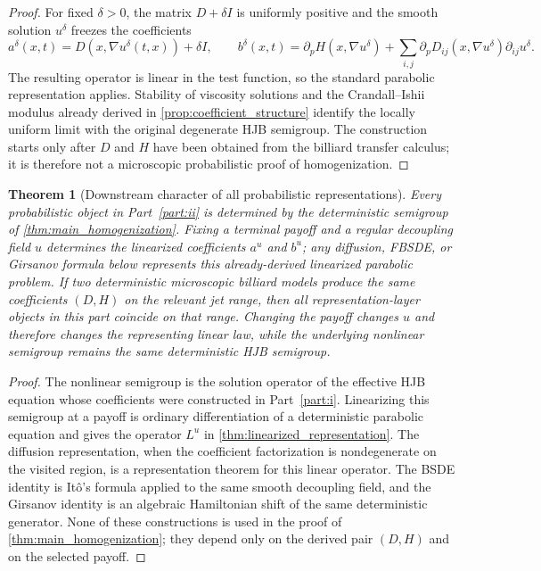 \documentclass[12pt, letterpaper]{amsart}
\theoremstyle{plain}
\newtheorem{theorem}{Theorem}[section]
\theoremstyle{definition}
\theoremstyle{remark}
\begin{document}
\begin{proof}
For fixed \(\delta>0\), the matrix \(D+\delta I\) is uniformly positive and the
smooth solution \(u^\delta\) freezes the coefficients
\begin{equation}
    a^\delta(x,t)=D(x,\nabla u^\delta(t,x))+\delta I,
    \qquad
    b^\delta(x,t)=\partial_pH(x,\nabla u^\delta)
       +\sum_{i,j}\partial_pD_{ij}(x,\nabla u^\delta)\partial_{ij}u^\delta .
\end{equation}
The resulting operator is linear in the test function, so the standard
parabolic representation applies.  Stability of viscosity solutions and the
Crandall--Ishii modulus already derived in \cref{prop:coefficient_structure}
identify the locally uniform limit with the original degenerate HJB semigroup.
The construction starts only after \(D\) and \(H\) have been obtained from the
billiard transfer calculus; it is therefore not a microscopic probabilistic
proof of homogenization.
\end{proof}

\begin{theorem}[Downstream character of all probabilistic representations]
\label{thm:downstream_probabilistic_representations}
Every probabilistic object in Part~\ref{part:ii} is determined by the
deterministic semigroup of \cref{thm:main_homogenization}.  Fixing a terminal
payoff and a regular decoupling field $u$ determines the linearized coefficients
$a^u$ and $b^u$; any diffusion, FBSDE, or Girsanov formula below represents this
already-derived linearized parabolic problem.  If two deterministic microscopic
billiard models produce the same coefficients $(D,H)$ on the relevant jet
range, then all representation-layer objects in this part coincide on that
range.  Changing the payoff changes $u$ and therefore changes the representing
linear law, while the underlying nonlinear semigroup remains the same
deterministic HJB semigroup.
\end{theorem}

\begin{proof}
The nonlinear semigroup is the solution operator of the effective HJB equation
whose coefficients were constructed in Part~\ref{part:i}.  Linearizing this
semigroup at a payoff is ordinary differentiation of a deterministic parabolic
equation and gives the operator $L^u$ in
\cref{thm:linearized_representation}.  The diffusion representation, when the
coefficient factorization is nondegenerate on the visited region, is a
representation theorem for this linear operator.  The BSDE identity is It\^o's
formula applied to the same smooth decoupling field, and the Girsanov identity
is an algebraic Hamiltonian shift of the same deterministic generator.  None of
these constructions is used in the proof of \cref{thm:main_homogenization};
they depend only on the derived pair $(D,H)$ and on the selected payoff.
\end{proof}
\end{document}
